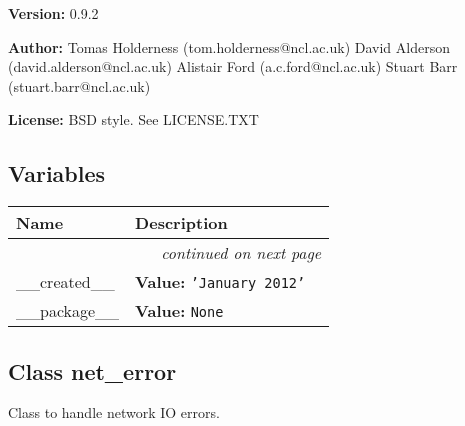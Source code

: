 \textbf{Version:} 0.9.2



\textbf{Author:} Tomas Holderness (tom.holderness@ncl.ac.uk)
David Alderson (david.alderson@ncl.ac.uk)
Alistair Ford (a.c.ford@ncl.ac.uk)
Stuart Barr (stuart.barr@ncl.ac.uk)



\textbf{License:} BSD style. See LICENSE.TXT





  \subsection{Variables}

    \vspace{-1cm}
\hspace{\varindent}\begin{longtable}{|p{\varnamewidth}|p{\vardescrwidth}|l}
\cline{1-2}
\cline{1-2} \centering \textbf{Name} & \centering \textbf{Description}& \\
\cline{1-2}
\endhead\cline{1-2}\multicolumn{3}{r}{\small\textit{continued on next page}}\\\endfoot\cline{1-2}
\endlastfoot\raggedright \_\-\_\-c\-r\-e\-a\-t\-e\-d\-\_\-\_\- & \raggedright \textbf{Value:} 
{\tt \texttt{'}\texttt{January 2012}\texttt{'}}&\\
\cline{1-2}
\raggedright \_\-\_\-p\-a\-c\-k\-a\-g\-e\-\_\-\_\- & \raggedright \textbf{Value:} 
{\tt None}&\\
\cline{1-2}
\end{longtable}



\subsection{Class net\_error}

    \label{nx_pgnet:net_error}
Class to handle network IO errors.


